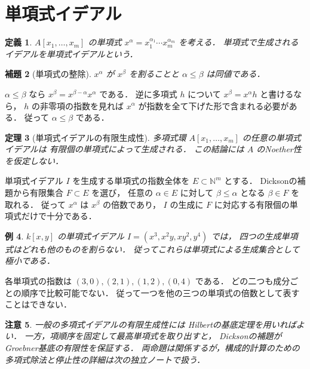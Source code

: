 \documentclass[a5paper,10pt,onecolumn]{jsarticle}
\makeatletter
\theoremstyle{mathnotetheorem}
\newtheorem{theorem}{定理}[section]
\newtheorem{definition}[theorem]{定義}
\newtheorem{lemma}[theorem]{補題}
\newtheorem{example}[theorem]{例}
\newtheorem{remark}[theorem]{注意}
\renewcommand{\proofname}{証明}
\renewenvironment{proof}[1][\proofname]{%
  \par\pushQED{\qed}\normalfont\topsep4\p@\@plus2\p@\relax
  \trivlist\item[\hskip\labelsep\bfseries #1]\ignorespaces
}{\popQED\endtrivlist\@endpefalse}
\makeatother
\begin{document}
\section{単項式イデアル}
\begin{definition}
$A[x_1,\ldots,x_m]$ の単項式
$x^\alpha=x_1^{\alpha_1}\cdots x_m^{\alpha_m}$ を考える．
単項式で生成されるイデアルを単項式イデアルという．
\end{definition}
\begin{lemma}[単項式の整除]
$x^\alpha$ が $x^\beta$ を割ることと
$\alpha\le\beta$ は同値である．
\end{lemma}
\begin{proof}
$\alpha\le\beta$ なら
$x^\beta=x^{\beta-\alpha}x^\alpha$ である．
逆に多項式 $h$ について
$x^\beta=x^\alpha h$ と書けるなら，
$h$ の非零項の指数を見れば
$x^\alpha$ が指数を全て下げた形で含まれる必要がある．
従って $\alpha\le\beta$ である．
\end{proof}
\begin{theorem}[単項式イデアルの有限生成性]\label{thm:monomial}
多項式環 $A[x_1,\ldots,x_m]$ の任意の単項式イデアルは
有限個の単項式によって生成される．
この結論には $A$ のNoether性を仮定しない．
\end{theorem}
\begin{proof}
単項式イデアル $I$ を生成する単項式の指数全体を
$E\subset\mathbb N^m$ とする．
Dicksonの補題から有限集合 $F\subset E$ を選び，
任意の $\alpha\in E$ に対して
$\beta\le\alpha$ となる $\beta\in F$ を取れる．
従って $x^\alpha$ は $x^\beta$ の倍数であり，
$I$ の生成に $F$ に対応する有限個の単項式だけで十分である．
\end{proof}
\begin{example}
$k[x,y]$ の単項式イデアル
$I=(x^3,x^2y,xy^2,y^4)$ では，
四つの生成単項式はどれも他のものを割らない．
従ってこれらは単項式による生成集合として極小である．
\end{example}
\begin{proof}
各単項式の指数は
$(3,0),(2,1),(1,2),(0,4)$ である．
どの二つも成分ごとの順序で比較可能でない．
従って一つを他の三つの単項式の倍数として表すことはできない．
\end{proof}
\begin{remark}
一般の多項式イデアルの有限生成性には
Hilbertの基底定理を用いればよい．
一方，項順序を固定して最高単項式を取り出すと，
Dicksonの補題がGroebner基底の有限性を保証する．
両命題は関係するが，構成的計算のための
多項式除法と停止性の詳細は次の独立ノートで扱う．
\end{remark}
\end{document}
